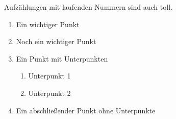 Aufzählungen mit laufenden Nummern sind auch toll.

\begin{enumerate}
  \item Ein wichtiger Punkt
  \item Noch ein wichtiger Punkt
  \item Ein Punkt mit Unterpunkten
    \begin{enumerate}
      \item Unterpunkt 1
      \item Unterpunkt 2
    \end{enumerate}
  \item Ein abschließender Punkt ohne Unterpunkte
\end{enumerate}

